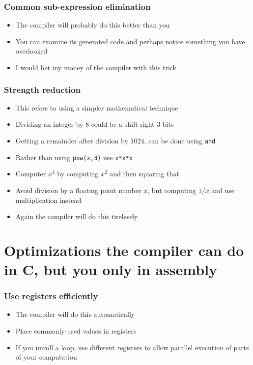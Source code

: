 \documentclass{beamer}
\begin{document}
\begin{frame}
    \frametitle{Common sub-expression elimination}
    \begin{itemize}
        \item The compiler will probably do this better than you
        \item You can examine its generated code and perhaps notice
              something you have overlooked
        \item I would bet my money of the compiler with this trick
    \end{itemize}
\end{frame}

\begin{frame}
    \frametitle{Strength reduction}
    \begin{itemize}
        \item This refers to using a simpler mathematical technique
        \item Dividing an integer by 8 could be a shift right 3 bits
        \item Getting a remainder after division by 1024, can be done using {\tt and}
        \item Rather than using {\tt pow(x,3)} use {\tt x*x*x}
        \item Computer $x^4$ by computing $x^2$ and then squaring that
        \item Avoid division by a floating point number $x$, but computing $1/x$ and
              use multiplication instead
        \item Again the compiler will do this tirelessly
    \end{itemize}
\end{frame}

\section{Optimizations the compiler can do in C, but you only in assembly}

\begin{frame}
    \frametitle{Use registers efficiently}
    \begin{itemize}
        \item The compiler will do this automatically
        \item Place commonly-used values in registers
        \item If you unroll a loop, use different registers
              to allow parallel execution of parts of your computation
    \end{itemize}

\end{frame}
\end{document}
